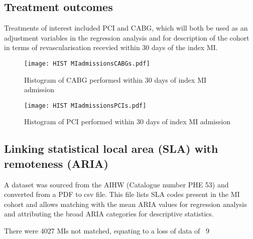 \documentclass[11pt]{article}
\begin{document}
\subsection{Treatment outcomes}
Treatments of interest included PCI and CABG, which will both be used as an adjustment variables in the regression analysis and for description of the cohort in terms of revascularisation recevied within 30 days of the index MI. 
\color{violet}
\begin{stlog}\end{stlog}
\color{black}
\begin{figure} [h]
	\centering
	\texttt{[image: HIST MIadmissionsCABGs.pdf]}
	\caption{Histogram of CABG performed within 30 days of index MI admission}
	\label{CABGs}
\end{figure}
\color{violet}
\begin{stlog}\end{stlog}
\color{black}
\begin{figure} [h]
	\centering 
	\texttt{[image: HIST MIadmissionsPCIs.pdf]}
	\caption{Histogram of PCI performed within 30 days of index MI admission}
	\label{PCIs}
\end{figure}
\color{violet}
\begin{stlog}\end{stlog}
\color{black}
\subsection{Linking statistical local area (SLA) with remoteness (ARIA)}
A dataset was sourced from the AIHW (Catalogue number PHE 53) and converted from a PDF to csv file. This file lists SLA codes present in the MI cohort and allows matching with the mean ARIA values for regression analysis and attributing the broad ARIA categories for descriptive statistics. 
\color{violet}
\begin{stlog}\end{stlog}
\color{black}
There were 4027 MIs not matched, equating to a loss of data of ~9%
\color{violet}
\begin{stlog}\end{stlog}
\color{black}
\end{document}
